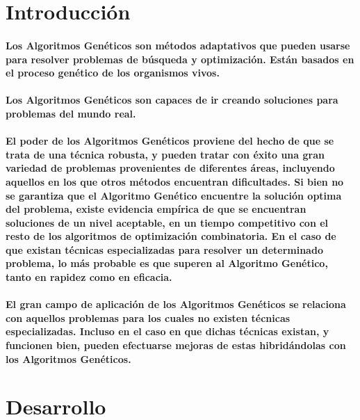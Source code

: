 \documentclass[10pt,a4paper]{article}
\begin{document}
{\begin{center}
\par\vspace{1.5cm}

\end{center}
\clearpage

}

\printindex

\section{
Introducci\'on
}

\paragraph{
Los Algoritmos Gen\'eticos son m\'etodos adaptativos que pueden usarse para resolver problemas de b\'usqueda y optimizaci\'on. Est\'an basados en el proceso gen\'etico de los organismos vivos.
}
\paragraph{
Los Algoritmos Gen\'eticos son capaces de ir creando soluciones para problemas del mundo real.
}
\paragraph{
El poder de los Algoritmos Gen\'eticos proviene del hecho de que se trata de una t\'ecnica robusta,
y pueden tratar con \'exito una gran variedad de problemas provenientes de diferentes \'areas, incluyendo aquellos en los que otros m\'etodos encuentran dificultades. Si bien no se garantiza que el Algoritmo Gen\'etico encuentre la soluci\'on optima del problema, existe evidencia emp\'irica de que se encuentran soluciones de un nivel aceptable, en un tiempo competitivo con el resto de los algoritmos de optimizaci\'on combinatoria. En el caso de que existan t\'ecnicas especializadas para resolver un determinado problema, lo m\'as probable es que superen al Algoritmo Gen\'etico, tanto en rapidez como en eficacia.
}
\paragraph{
 El gran campo de aplicaci\'on de los Algoritmos Gen\'eticos se relaciona con aquellos problemas para los cuales no existen t\'ecnicas especializadas. Incluso en el caso en que dichas t\'ecnicas existan, y funcionen bien, pueden efectuarse mejoras de estas hibrid\'andolas con los Algoritmos Gen\'eticos.
}
\newpage
\section{Desarrollo}
\end{document}
